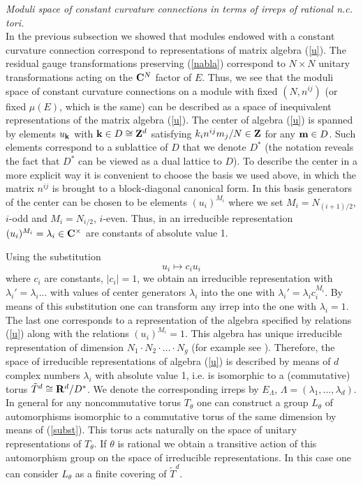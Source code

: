 \documentclass[a4paper,a4paper]{article}
\begin{document}
{\it Moduli space of constant curvature connections in terms of irreps of rational n.c. tori.}\\
In the previous subsection we showed that modules endowed with a constant curvature connection correspond to  representations of 
matrix algebra (\ref{u}). The residual gauge transformations preserving (\ref{nabla}) correspond to $N\times N$ 
unitary transformations acting on the ${\bf C}^{N}$ factor  of $E$. Thus, we see that the moduli space of 
 constant curvature connections on a module with fixed $(N, n^{ij})$ (or fixed $\mu(E)$, 
which is the same)  can be described as a space of inequivalent representations of the matrix algebra (\ref{u}).
 The center of algebra  (\ref{u}) is spanned by elements $u_{\bf k}$ with ${\bf k}\in D\cong {\bf Z}^{d}$ satisfying 
$k_{i}n^{ij}m_{j}/N \in {\bf Z}$ for any ${\bf m}\in D$. Such elements correspond to a sublattice of $D$ that we denote $D^{*}$ 
(the notation reveals the fact that $D^{*}$ can be viewed as a dual lattice to $D$). 
To describe the center in a more explicit way it is convenient to choose the basis we used above, in which the matrix  $n^{ij}$ 
is brought to a block-diagonal canonical form. 
In this basis  generators of the center can be chosen to be elements  $(u_{i})^{M_{i}}$ where we set 
 $M_{i} = N_{(i+1)/2}$, $i$-odd and  $M_{i} = N_{i/2}$, $i$-even.
Thus, in an irreducible 
representation $(u_{i})^{M_{i}}=\lambda_{i} \in {\bf C}^{\times}$ are constants of absolute value 1. 

Using the substitution
\begin{equation}\label{subst}
u_{i} \mapsto c_{i} u_{i}
\end{equation}
where $c_{i}$ are constants, $|c_{i}|=1$,  we obtain an irreducible representation with $\lambda_{i}'=\lambda_{i}...$ 
with values of center generators $\lambda_{i}$ into the one with $\lambda_{i}'=\lambda_{i}c_{i}^{M_{i}}$. 
 By means of this substitution one can transform any irrep into the one with $\lambda_{i} =1$. The last one corresponds to a representation of the 
algebra specified by relations (\ref{u}) along with the relations $(u_{i})^{M_{i}} =1$.
 This algebra has 
 unique irreducible representation of dimension  $N_{1}\cdot N_{2} \cdot \dots \cdot N_{g}$ (for example see \cite{vanBaal}). 
Therefore, the space of irreducible representations of algebra (\ref{u}) is described by means of $d$
complex numbers $\lambda_{i}$ with absolute value 1, i.e. is isomorphic to a (commutative) torus $\tilde T^{d}\cong {\bf R}^{d}/D^{*}$. 
We denote the corresponding 
irreps by $E_{\Lambda}$, $\Lambda=(\lambda_{1}, \dots , \lambda_{d})$.
In general for any noncommutative torus $T_{\theta}$ one can construct a group $L_{\theta}$ of automorphisms isomorphic to 
a commutative torus of the same dimension by means of (\ref{subst}). This torus acts naturally on the space of 
unitary representations of $T_{\theta}$. If $\theta$ is rational we obtain a transitive action of this automorphism 
group on the space of irreducible representations. In this case one can consider $L_{\theta}$ as a finite covering 
of $\tilde T^{d}$.
\end{document}
